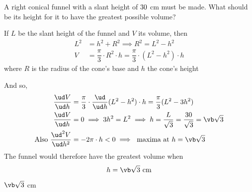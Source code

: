 


\DIVIDE{}\vb

\question[3] A right conical funnel with a slant height of $30$ cm must be made. What should 
be its height for it to have the greatest possible volume?

\watchout

\begin{solution}[\halfpage]
   If $L$ be the slant height of the funnel and $V$ its volume, then 
   \begin{align}
       L^2 &= h^2 + R^2 \implies R^2 = L^2 - h^2 \\ 
       V &= \dfrac{\pi}{3}\cdot R^2\cdot h = \dfrac{\pi}{3}\cdot(L^2 - h^2)\cdot h
   \end{align}
   where $R$ is the radius of the cone's base and $h$ the cone's height
   
   And so, 
   \begin{align}
      \dfrac{\ud V}{\ud h} &= \dfrac{\pi}{3}\cdot\dfrac{\ud}{\ud h}(L^2-h^2)\cdot h 
      = \dfrac{\pi}{3}(L^2 - 3h^2) \\
      \dfrac{\ud V}{\ud h} &= 0\implies 3h^2 = L^2 \implies h = \dfrac{L}{\sqrt{3}}
      = \dfrac\va{\sqrt{3}} = \vb\sqrt{3} \\
      \text{Also }\dfrac{\ud^2 V}{\ud h^2} &= -2\pi\cdot h < 0 \implies \text{ maxima at }
      h = \vb\sqrt{3}
   \end{align}
   The funnel would therefore have the greatest volume when 
   \[ h = \vb\sqrt{3}\text{ cm} \] 
   
\end{solution}
\ifprintanswers\begin{codex}$\vb\sqrt{3}$ cm\end{codex}\fi
